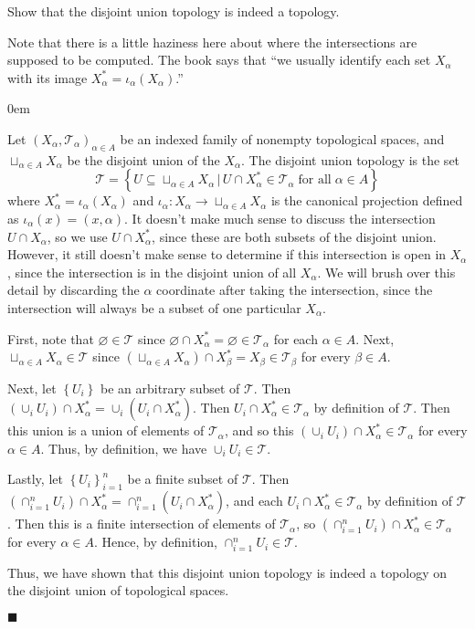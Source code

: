 \documentclass[12pt]{article}
\renewcommand{\qed}{\hfill$\blacksquare$}
\renewenvironment{proof}{\begin{addmargin}[1em]{0em}\begin{newproof}}{\end{newproof}\end{addmargin}\qed}
\newenvironment{exercise}[2][Exercise]{\begin{trivlist}
\item[\hskip \labelsep {\bfseries #1}\hskip \labelsep {\bfseries #2.}]}{\end{trivlist}}
\begin{document}
\begin{exercise}{3.40}
Show that the disjoint union topology is indeed a topology.
\end{exercise}
{\color{red}Note that there is a little haziness here about where the intersections are supposed to be computed. The book says that ``we usually identify each set $X_{\alpha}$ with its image $X_{\alpha}^* = \iota_{\alpha}\left(X_{\alpha}\right)$.''}\\
\begin{proof}
Let $\left(X_{\alpha}, \mathcal{T}_{\alpha}\right)_{\alpha \in A}$ be an indexed family of nonempty topological spaces, and $\sqcup_{\alpha \in A} X_{\alpha}$ be the disjoint union of the $X_{\alpha}$. The disjoint union topology is the set $$\mathcal{T}= \left\{ U \subseteq \sqcup_{\alpha \in A} X_{\alpha} \, | \, U\cap X_{\alpha}^* \in \mathcal{T}_{\alpha} \; \text{for all} \; \alpha \in A\right\}$$ where $X_{\alpha}^* = \iota_{\alpha}\left(X_{\alpha}\right)$ and $\iota_{\alpha}:X_{\alpha}\rightarrow \sqcup_{\alpha \in A} X_{\alpha}$ is the canonical projection defined as $\iota_{\alpha}\left(x\right) = \left(x,\alpha\right)$. {\color{red} It doesn't make much sense to discuss the intersection $U\cap X_{\alpha}$, so we use $U\cap X_{\alpha}^*$, since these are both subsets of the disjoint union. However, it still doesn't make sense to determine if this intersection is open in $X_{\alpha}$, since the intersection is in the disjoint union of all $X_{\alpha}$. We will brush over this detail by discarding the $\alpha$ coordinate after taking the intersection, since the intersection will always be a subset of one particular $X_{\alpha}$.}

First, note that $\varnothing \in \mathcal{T}$ since $\varnothing \cap X_{\alpha}^* = \varnothing \in \mathcal{T}_{\alpha}$ for each $\alpha \in A$. Next, $\sqcup_{\alpha \in A}X_{\alpha} \in \mathcal{T}$ since $\left(\sqcup_{\alpha \in A} X_{\alpha} \right) \cap  X_{\beta}^* = X_{\beta} \in \mathcal{T}_{\beta} $ for every $\beta \in A$.

Next, let $\left\{U_i\right\}$ be an arbitrary subset of $\mathcal{T}$. Then $\left(\cup_i U_i\right)\cap X^*_{\alpha} = \cup_i \left(U_i \cap X^*_\alpha \right) $. Then $U_i \cap X_{\alpha}^* \in \mathcal{T}_{\alpha}$ by definition of $\mathcal{T}$. Then this union is a union of elements of $\mathcal{T}_{\alpha}$, and so this $\left(\cup_i U_i\right)\cap X_{\alpha}^* \in \mathcal{T}_{\alpha}$ for every $\alpha \in A$. Thus, by definition, we have $\cup_i U_i \in \mathcal{T}$.

Lastly, let $\left\{U_i\right\}_{i=1}^n$ be a finite subset of $\mathcal{T}$. Then $\left(\cap_{i=1}^n U_i\right)\cap X_{\alpha}^* = \cap_{i=1}^n \left(U_i \cap X_{\alpha}^*\right)$, and each $U_i \cap X_{\alpha}^* \in \mathcal{T}_{\alpha}$ by definition of $\mathcal{T}$. Then this is a finite intersection of elements of $\mathcal{T}_{\alpha}$, so $\left(\cap_{i=1}^n U_i\right)\cap X_{\alpha}^* \in \mathcal{T}_{\alpha}$ for every $\alpha \in A$. Hence, by definition, $\cap_{i=1}^n U_i \in \mathcal{T}$.

Thus, we have shown that this disjoint union topology is indeed a topology on the disjoint union of topological spaces.
\end{proof}
\end{document}
